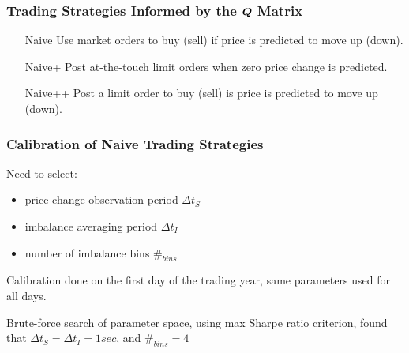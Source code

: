 \begin{frame}
\frametitle{Trading Strategies Informed by the $\boldsymbol{Q}$ Matrix}
\begin{itemize}
\item[Naive] Use market orders to buy (sell) if price is predicted to move up (down).
\item[Naive+] Post at-the-touch limit orders when zero price change is predicted.
\item[Naive++] Post a limit order to buy (sell) is price is predicted to move up (down).
\end{itemize}
\end{frame}

\begin{frame}
\frametitle{Calibration of Naive Trading Strategies}
Need to select:
\begin{itemize}
\item price change observation period $\Delta t_S$
\item imbalance averaging period $\Delta t_I$
\item number of imbalance bins $\#_{bins}$
\end{itemize}
Calibration done on the first day of the trading year, same parameters used for all days.

Brute-force search of parameter space, using max Sharpe ratio criterion, found that $\Delta t_S = \Delta t_I = 1 sec$, and $\#_{bins} = 4$
\end{frame}

